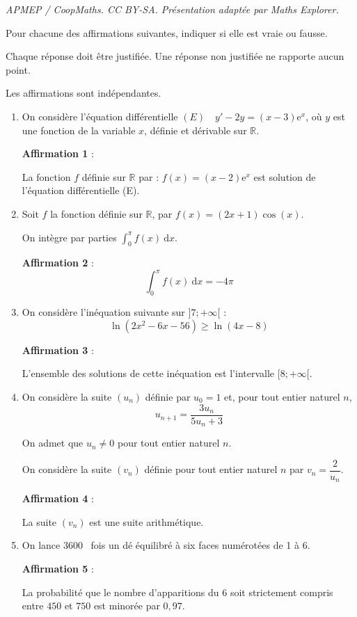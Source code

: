 \documentclass[10pt]{article}
\providecommand{\R}{\mathbb{R}}
\providecommand{\e}{{\mathrm{e}}}
\providecommand{\np}[2][]{{#2~#1}}
\begin{document}
\noindent\textit{APMEP / CoopMaths. CC BY-SA. Présentation adaptée par Maths Explorer.}\par\medskip
Pour chacune des affirmations suivantes, indiquer si elle est vraie ou fausse.

Chaque réponse doit être justifiée. Une réponse non justifiée ne rapporte aucun point.

Les affirmations sont indépendantes.

\medskip

\begin{enumerate}
	\item On considère l'équation différentielle \quad $(E)\quad y' - 2y = (x- 3)\e^x$,
	\quad
	où $y$ est une fonction de la variable $x$, définie et dérivable sur $\R$.

	\textbf{Affirmation 1} :

	La fonction $f$ définie sur $\R$ par : $f(x) = (x - 2)\e^x$ est solution de l'équation différentielle (E).

	\item Soit $f$ la fonction définie sur $\R$, par \quad $f(x) = (2x + 1) \cos (x)$.

	On intègre par parties $\displaystyle\int_0^{\pi} f(x)\:\text{d}x$.

	\textbf{Affirmation 2} :
	\[\displaystyle\int_0^{\pi} f(x)\:\text{d}x =  - 4\pi\]

	\item On considère l'inéquation suivante sur $]7 ; +\infty[$ :
	\[\ln \left(2x^2 - 6x - 56\right) \geqslant \ln(4x - 8)\]

	\textbf{Affirmation 3} :

	L'ensemble des solutions de cette inéquation est l'intervalle $[8 ; +\infty[$.

	\item On considère la suite $(u_n)$ définie par $u_0 = 1$ et, pour tout entier naturel $n$,
	\[u_{n+1} = \dfrac{ 3u_n}{5u_n + 3}\]

	On admet que $u_n \ne 0$ pour tout entier naturel $n$.

	On considère la suite $(v_n)$ définie pour tout entier naturel $n$ par \quad $v_n = \dfrac{2}{u_n}$.

	\textbf{Affirmation 4} :

	La suite $(v_n)$ est une suite arithmétique.
	\item On lance \np{3600} fois un dé équilibré à six faces numérotées de 1 à 6.

	\textbf{Affirmation 5} :

	La probabilité que le nombre d'apparitions du 6 soit strictement compris entre $450$ et $750$ est minorée par $0,97$.
\end{enumerate}

\end{document}
